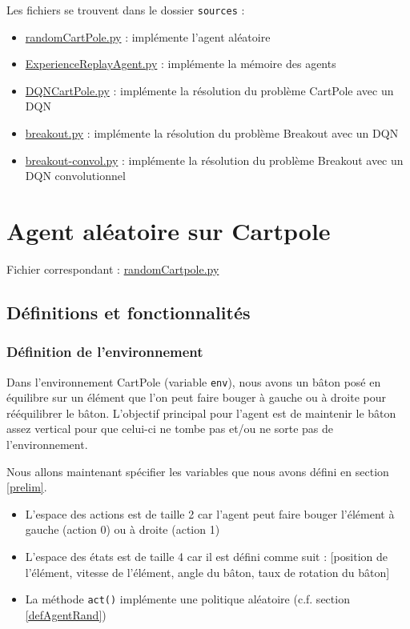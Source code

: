 \documentclass[10pt,a4paper]{article}
\begin{document}
Les fichiers se trouvent dans le dossier \lstinline{sources} :
\begin{itemize}
	\item \href{https://github.com/NellyBarret/IA5-TP-APR/blob/master/sources/randomCartPole.py}{randomCartPole.py} : implémente l'agent aléatoire
	\item \href{https://github.com/NellyBarret/IA5-TP-APR/blob/master/sources/ExperienceReplayAgent.py}{ExperienceReplayAgent.py} : implémente la mémoire des agents
	\item \href{https://github.com/NellyBarret/IA5-TP-APR/blob/master/sources/DQNCartPole.py}{DQNCartPole.py} : implémente la résolution du problème CartPole avec un DQN
	\item \href{https://github.com/NellyBarret/IA5-TP-APR/blob/master/sources/breakout.py}{breakout.py} : implémente la résolution du problème Breakout avec un DQN
	\item \href{https://github.com/NellyBarret/IA5-TP-APR/blob/master/sources/breakout-convol.py}{breakout-convol.py} : implémente la résolution du problème Breakout avec un DQN convolutionnel
\end{itemize}


\section{Agent aléatoire sur Cartpole}

Fichier correspondant : \href{https://github.com/NellyBarret/IA5-TP-APR/blob/master/sources/randomCartPole.py}{randomCartpole.py}

\subsection{Définitions et fonctionnalités}
\subsubsection{Définition de l'environnement}
Dans l'environnement CartPole (variable \lstinline{env}), nous avons un bâton posé en équilibre sur un élément que l'on peut faire bouger à gauche ou à droite pour rééquilibrer le bâton. L'objectif principal pour l'agent est de maintenir le bâton assez vertical pour que celui-ci ne tombe pas et/ou ne sorte pas de l'environnement.

Nous allons maintenant spécifier les variables que nous avons défini en section \ref{prelim}.
\begin{itemize}
	\item L'espace des actions est de taille 2 car l'agent peut faire bouger l'élément à gauche (action 0) ou à droite (action 1)
	\item L'espace des états est de taille 4 car il est défini comme suit : [position de l'élément, vitesse de l'élément, angle du bâton, taux de rotation du bâton]
	\item La méthode \lstinline{act()} implémente une politique aléatoire (c.f. section \ref{defAgentRand})
\end{itemize}
\end{document}

